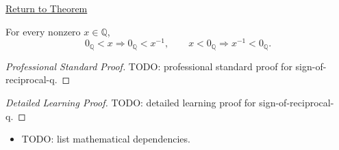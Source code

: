 \newpage
{}
\label{prf:sign-of-reciprocal-q}

\begin{remark*}[Return]
\hyperref[thm:sign-of-reciprocal-q]{Return to Theorem}
\end{remark*}

\begin{theorem*}
For every nonzero $x\in\mathbb{Q}$,
\[
0_{\mathbb{Q}}<x \Longrightarrow 0_{\mathbb{Q}}<x^{-1},
\qquad
x<0_{\mathbb{Q}} \Longrightarrow x^{-1}<0_{\mathbb{Q}}.
\]
\end{theorem*}

\begin{proof}[Professional Standard Proof]
\LRAProofBodyStart
TODO: professional standard proof for sign-of-reciprocal-q.
\end{proof}

\begin{proof}[Detailed Learning Proof]
\LRAProofBodyStart
TODO: detailed learning proof for sign-of-reciprocal-q.
\end{proof}

\begin{remark*}
\end{remark*}

\begin{dependencies}
\begin{itemize}
  \item TODO: list mathematical dependencies.
\end{itemize}
\end{dependencies}

\clearpage
